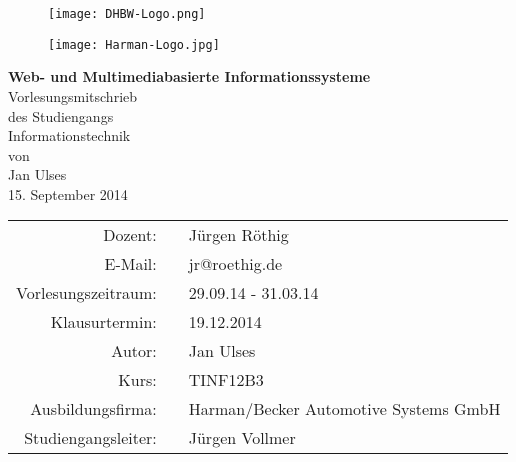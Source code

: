 \begin{titlepage}

  \onehalfspacing
  \begin{figure}[htbp]
    \begin{minipage}{0.4\textwidth}
     \centering
      \texttt{[image: DHBW-Logo.png]}
    \end{minipage}\hfill
    \begin{minipage}{0.4\textwidth}
     \centering
      \texttt{[image: Harman-Logo.jpg]}
    \end{minipage}
  \end{figure}

  \begin{center}	
	\vspace*{2,5cm}
    \huge
	\textbf{Web- und Multimediabasierte Informationssysteme\\}
	\vspace*{2cm}
    \Large Vorlesungsmitschrieb\\
    \vspace*{0,5cm}
    \normalsize des Studiengangs\\
    \Large Informationstechnik\\
    \vspace*{0,75cm}
    \normalsize von\\
    \Large Jan Ulses\\
    \vspace*{0,75cm}
    \large 15. September 2014\\
    \vspace*{1,8cm}
    \small
    \renewcommand{\arraystretch}{1,2}
    \singlespacing
    \begin{tabular}{rcl}
    	\hline
  		Dozent: & & Jürgen Röthig\\
  		E-Mail: & & jr@roethig.de\\
  		Vorlesungszeitraum: & \hspace*{0,5mm} & 29.09.14 - 31.03.14 \\
  		Klausurtermin: & & 19.12.2014\\
  		Autor: & & Jan Ulses\\
  		Kurs: & & TINF12B3\\
  		Ausbildungsfirma: & & Harman/Becker Automotive Systems GmbH\\
  		Studiengangsleiter: & & Jürgen Vollmer\\
  		\hline
 	\end{tabular}
    
  \end{center}
  \normalsize
  \vfill
  
\end{titlepage}